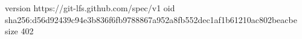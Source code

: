 version https://git-lfs.github.com/spec/v1
oid sha256:d56d92439c94e3b836f6fb9788867a952a8fb552dec1af1b61210ac802beacbe
size 402
